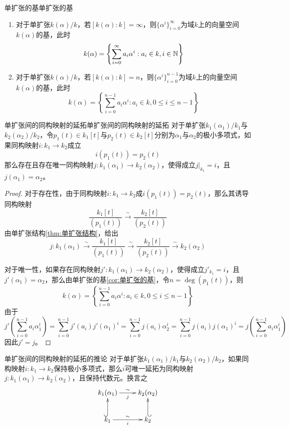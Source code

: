 \begin{corollary}{单扩张的基}{单扩张的基}
	\begin{enumerate}
		\item 对于单扩张$k(\alpha)/k$，若$[k(\alpha):k]=\infty$，则$\{ \alpha^i \}_{i=0}^{\infty}$为域$k$上的向量空间$k(\alpha)$的基，此时
		$$
		k(\alpha)=\left\{ \sum_{i=0}^{\infty}a_i\alpha^i:a_i\in k,i\in\mathbb{N} \right\}
		$$
		\item 对于单扩张$k(\alpha)/k$，若$[k(\alpha):k]=n$，则$\{ \alpha^i \}_{i=0}^{n-1}$为域$k$上的向量空间$k(\alpha)$的基，此时
		$$
		k(\alpha)=\left\{ \sum_{i=0}^{n-1}a_i\alpha^i:a_i\in k,0\le i \le n-1 \right\}
		$$
	\end{enumerate}
\end{corollary}

\begin{proposition}{单扩张间的同构映射的延拓}{单扩张间的同构映射的延拓}
	对于单扩张$k_1(\alpha_1)/k_1$与$k_2(\alpha_2)/k_2$，令$p_1(t)\in k_1[t]$与$p_2(t)\in k_2[t]$分别为$\alpha_1$与$\alpha_2$的极小多项式，如果同构映射$i:k_1\to k_2$成立%
	$$
	i(p_1(t))=p_2(t)
	$$
	那么存在且存在唯一同构映射$j:k_1(\alpha_1)\to k_2(\alpha_2)$，使得成立$j|_{k_1}=i$，且$j(\alpha_1)=\alpha_2$。
\end{proposition}

\begin{proof}
	对于存在性，由于同构映射$i:k_1\to k_2$成$i(p_1(t))=p_2(t)$，那么其诱导同构映射%
	$$
	\frac{k_1[t]}{(p_1(t))}\xrightarrow{\sim}\frac{k_2[t]}{(p_2(t))}
	$$
	由单扩张结构\ref{thm:单扩张结构}，给出%
	$$
	j:k_1(\alpha_1)
	\xrightarrow{\sim}\frac{k_1[t]}{(p_1(t))}
	\xrightarrow{\sim}\frac{k_2[t]}{(p_2(t))}
	\xrightarrow{\sim}k_2(\alpha_2)
	$$
	
	对于唯一性，如果存在同构映射$j':k_1(\alpha_1)\to k_2(\alpha_2)$，使得成立$j'_{k_1}=i$，且$j'(\alpha_1)=\alpha_2$，那么由单扩张的基\ref{cor:单扩张的基}，令$n=\deg(p_1(t))$，则
	$$
	k(\alpha)=\left\{ \sum_{i=0}^{n-1}a_i\alpha^i:a_i\in k,0\le i \le n-1 \right\}
	$$
	由于
	$$
	j'\left(\sum_{i=0}^{n-1}a_i\alpha_1^i\right)
	=\sum_{i=0}^{n-1}j'(a_i)j'(\alpha_1)^i
	=\sum_{i=0}^{n-1}j(a_i)\alpha_2^i
	=\sum_{i=0}^{n-1}j(a_i)j(\alpha_1)^i
	=j\left(\sum_{i=0}^{n-1}a_i\alpha_1^i\right)
	$$
	因此$j'=j$。
\end{proof}

\begin{corollary}{}{单扩张间的同构映射的延拓的推论}
	对于单扩张$k_1(\alpha_1)/k_1$与$k_2(\alpha_2)/k_2$，如果同构映射$i:k_1\to k_2$保持极小多项式，那么$i$可唯一延拓为同构映射$j:k_1(\alpha_1)\to k_2(\alpha_2)$，且保持代数元。换言之
	$$
	\xymatrix{
		k_1(\alpha_1) \ar[r]^\sim_j & k_2(\alpha_2)\\
		k_1 \ar[r]^\sim_i \ar@{^(->}[u] & k_2 \ar@{_(->}[u]
	}
	$$
\end{corollary}

